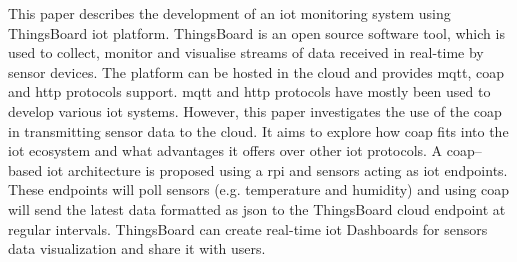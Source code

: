 This paper describes the development of an \gls{iot} monitoring system using
ThingsBoard \gls{iot} platform.
ThingsBoard is an open source software tool, which is used to collect,
monitor and visualise streams of data received in real-time by sensor devices.
The platform can be hosted in the cloud and provides 
\gls{mqtt}, \gls{coap} and \gls{http} protocols support.
\gls{mqtt} and \gls{http} protocols have mostly been used to develop various \gls{iot} systems.
However, this paper investigates the use of the \gls{coap} in transmitting sensor data to the cloud.
It aims to explore how \gls{coap} fits into the \gls{iot} ecosystem and what advantages it offers over other \gls{iot} protocols.
A \gls{coap}--based \gls{iot} architecture is proposed using a \gls{rpi} and sensors acting as \gls{iot} endpoints.
These endpoints will poll sensors (e.g. temperature and humidity) and using \gls{coap} 
will send the latest data formatted as \gls{json} to the ThingsBoard cloud endpoint at regular intervals.
ThingsBoard can create real-time \gls{iot} Dashboards for sensors data visualization and share it with users.